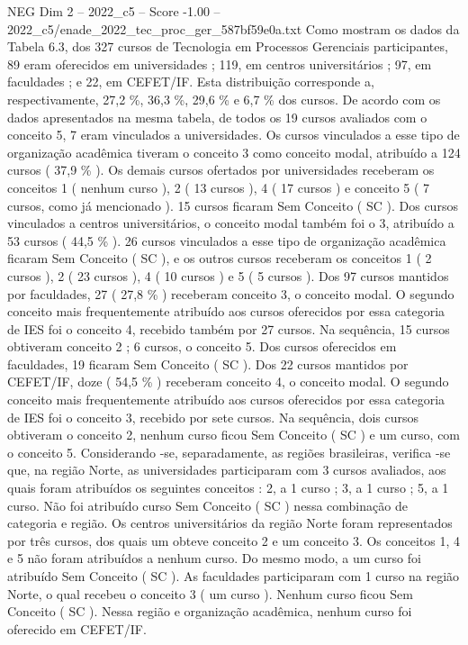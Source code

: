 \begin{textsample}{NEG Dim 2 – 2022\_c5 – Score -1.00 – 2022\_c5/enade\_2022\_tec\_proc\_ger\_587bf59e0a.txt}
Como mostram os dados da Tabela 6.3, dos 327 cursos de Tecnologia em Processos Gerenciais participantes, 89 eram oferecidos em universidades ; 119, em centros universitários ; 97, em faculdades ; e 22, em CEFET/IF.
Esta distribuição corresponde a, respectivamente, 27,2 \%, 36,3 \%, 29,6 \% e 6,7 \% dos cursos.
De acordo com os dados apresentados na mesma tabela, de todos os 19 cursos avaliados com o conceito 5, 7 eram vinculados a universidades.
Os cursos vinculados a esse tipo de organização acadêmica tiveram o conceito 3 como conceito modal, atribuído a 124 cursos ( 37,9 \% ).
Os demais cursos ofertados por universidades receberam os conceitos 1 ( nenhum curso ), 2 ( 13 cursos ), 4 ( 17 cursos ) e conceito 5 ( 7 cursos, como já mencionado ). 15 cursos ficaram Sem Conceito ( SC ).
Dos cursos vinculados a centros universitários, o conceito modal também foi o 3, atribuído a 53 cursos ( 44,5 \% ). 26 cursos vinculados a esse tipo de organização acadêmica ficaram Sem Conceito ( SC ), e os outros cursos receberam os conceitos 1 ( 2 cursos ), 2 ( 23 cursos ), 4 ( 10 cursos ) e 5 ( 5 cursos ).
Dos 97 cursos mantidos por faculdades, 27 ( 27,8 \% ) receberam conceito 3, o conceito modal.
O segundo conceito mais frequentemente atribuído aos cursos oferecidos por essa categoria de IES foi o conceito 4, recebido também por 27 cursos.
Na sequência, 15 cursos obtiveram conceito 2 ; 6 cursos, o conceito 5.
Dos cursos oferecidos em faculdades, 19 ficaram Sem Conceito ( SC ).
Dos 22 cursos mantidos por CEFET/IF, doze ( 54,5 \% ) receberam conceito 4, o conceito modal.
O segundo conceito mais frequentemente atribuído aos cursos oferecidos por essa categoria de IES foi o conceito 3, recebido por sete cursos.
Na sequência, dois cursos obtiveram o conceito 2, nenhum curso ficou Sem Conceito ( SC ) e um curso, com o conceito 5.
Considerando -se, separadamente, as regiões brasileiras, verifica -se que, na região Norte, as universidades participaram com 3 cursos avaliados, aos quais foram atribuídos os seguintes conceitos : 2, a 1 curso ; 3, a 1 curso ; 5, a 1 curso.
Não foi atribuído curso Sem Conceito ( SC ) nessa combinação de categoria e região.
Os centros universitários da região Norte foram representados por três cursos, dos quais um obteve conceito 2 e um conceito 3.
Os conceitos 1, 4 e 5 não foram atribuídos a nenhum curso.
Do mesmo modo, a um curso foi atribuído Sem Conceito ( SC ).
As faculdades participaram com 1 curso na região Norte, o qual recebeu o conceito 3 ( um curso ).
Nenhum curso ficou Sem Conceito ( SC ).
Nessa região e organização acadêmica, nenhum curso foi oferecido em CEFET/IF.

\end{textsample}
